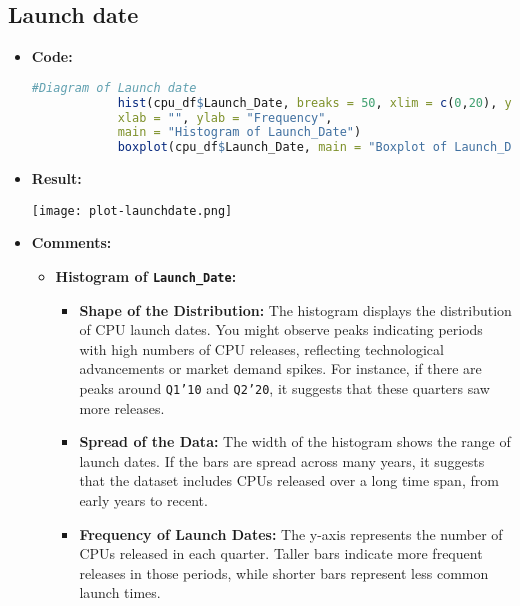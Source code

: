\documentclass{article}
\begin{document}
	\subsection{Launch date}
	\begin{itemize}
		\item \textbf{Code:}
		\begin{lstlisting}[basicstyle=\ttfamily, frame=single,language=R]
			#Diagram of Launch date
			hist(cpu_df$Launch_Date, breaks = 50, xlim = c(0,20), ylim = c(0,600),
			xlab = "", ylab = "Frequency",
			main = "Histogram of Launch_Date")
			boxplot(cpu_df$Launch_Date, main = "Boxplot of Launch_Date")
		\end{lstlisting}
		\item \textbf{Result:}
		\begin{center} \texttt{[image: plot-launchdate.png]}    \end{center}
		\item \textbf{Comments:}
		\begin{itemize}
			\item \textbf{Histogram of \texttt{Launch\_Date}:}
			\begin{itemize}
				\item \textbf{Shape of the Distribution:} 
				The histogram displays the distribution of CPU launch dates. You might observe peaks indicating periods with high numbers of CPU releases, reflecting technological advancements or market demand spikes. For instance, if there are peaks around \texttt{Q1'10} and \texttt{Q2'20}, it suggests that these quarters saw more releases.
				\item \textbf{Spread of the Data:} 
				The width of the histogram shows the range of launch dates. If the bars are spread across many years, it suggests that the dataset includes CPUs released over a long time span, from early years to recent.
				\item \textbf{Frequency of Launch Dates:} 
				The y-axis represents the number of CPUs released in each quarter. Taller bars indicate more frequent releases in those periods, while shorter bars represent less common launch times.
			\end{itemize}
			

\end{itemize}
\end{itemize}
\end{document}
